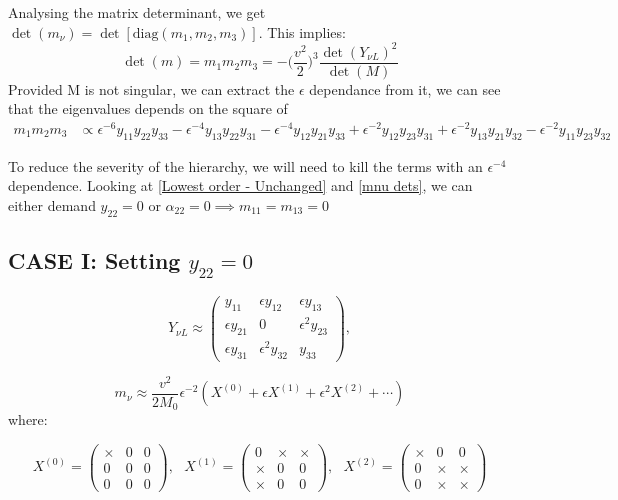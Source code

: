 Analysing the matrix determinant, we get $\det(m_\nu) = \det[\text{diag}(m_1,m_2,m_3)]$. This implies: 
\begin{equation}
    \det(m) = m_1m_2m_3 = -\Big(\frac{v^2}{2}\Big)^3\frac{\det(Y_{\nu L})^2}{\det(M)}    
\end{equation}
Provided M is not singular, we can extract the $\epsilon$ dependance from it, we can see that the eigenvalues depends on the square of
\begin{align} \label{mnu dets}
    m_1m_2m_3 &\propto 
    \epsilon^{-6} y_{11} y_{22} y_{33}  - \epsilon^{-4} y_{13} y_{22} y_{31} - \epsilon^{-4}y_{12} y_{21} y_{33} +  \epsilon^{-2}y_{12} y_{23} y_{31} + \epsilon^{-2} y_{13} y_{21} y_{32} - 
    \epsilon^{-2}y_{11} y_{23} y_{32} 
\end{align}

To reduce the severity of the hierarchy, we will need to kill the terms with an $\epsilon^{-4}$ dependence. Looking at \cref{Lowest order - Unchanged} and \cref{mnu dets}, we can either demand $y_{22} = 0$ or $\alpha_{22}=0 \implies m_{11} = m_{13} =0$

\subsection{CASE I: Setting $y_{22} = 0$} 
\begin{equation} \label{Textured Yukawa Neutrino}
    Y_{\nu L} \approx
    \begin{pmatrix}
        y_{11} &\epsilon y_{12} & \epsilon y_{13} \\
        \epsilon y_{21}&0&\epsilon^{2}y_{23}\\
        \epsilon y_{31}& \epsilon^{2}y_{32}&y_{33}
    \end{pmatrix},
\end{equation}

\begin{equation}
    m_\nu \approx \frac{v^2}{2M_0} \epsilon^{-2} (X^{(0)} + \epsilon X^{(1)} + \epsilon^2 X^{(2)} + \cdots) 
\end{equation}
where:

\begin{equation}
    X^{(0)} = \begin{pmatrix}
        \times &  0 & 0 \\
        0  & 0  &  0  \\
        0  & 0  & 0
    \end{pmatrix}, \,\,\,\,  X^{(1)} = \begin{pmatrix}
        0 & \times & 
        \times \\
        \times &  0 &0  \\
        \times  & 0  & 0
    \end{pmatrix}, \,\,\,\, 
     X^{(2)} = \begin{pmatrix}
    \times & 0 & 0 \\
    0 & \times & \times  \\
    0& \times &\times 
    \end{pmatrix}
\end{equation}

